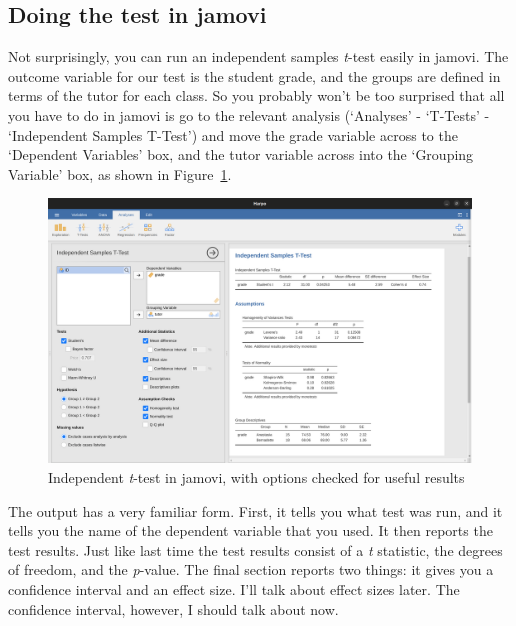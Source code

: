 \documentclass[
  a4paper,
]{book}
\begin{document}
\hypertarget{doing-the-test-in-jamovi-3}{%
\subsection{Doing the test in jamovi}\label{doing-the-test-in-jamovi-3}}

Not surprisingly, you can run an independent samples \emph{t}-test
easily in jamovi. The outcome variable for our test is the student
grade, and the groups are defined in terms of the tutor for each class.
So you probably won't be too surprised that all you have to do in jamovi
is go to the relevant analysis (`Analyses' - `T-Tests' - `Independent
Samples T-Test') and move the grade variable across to the `Dependent
Variables' box, and the tutor variable across into the `Grouping
Variable' box, as shown in Figure~\ref{fig-fig11-9}.

\begin{figure}

\includegraphics[width=1\textwidth,height=\textheight]{images/fig11-9.png} \hfill{}

\caption{\label{fig-fig11-9}Independent \emph{t}-test in jamovi, with
options checked for useful results}

\end{figure}

The output has a very familiar form. First, it tells you what test was
run, and it tells you the name of the dependent variable that you used.
It then reports the test results. Just like last time the test results
consist of a \emph{t} statistic, the degrees of freedom, and the
\emph{p}-value. The final section reports two things: it gives you a
confidence interval and an effect size. I'll talk about effect sizes
later. The confidence interval, however, I should talk about now.
\end{document}
